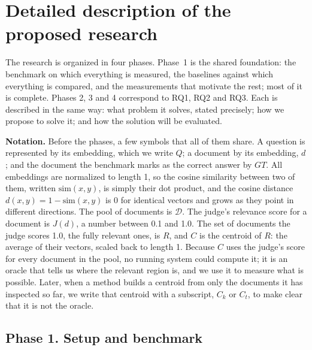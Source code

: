 \documentclass[12pt,a4paper]{article}
\newcommand{\dist}{d}
\newcommand{\simf}{\mathrm{sim}}
\begin{document}
\section{Detailed description of the proposed research}

The research is organized in four phases. Phase~1 is the shared foundation: the benchmark on which everything is measured, the baselines against which everything is compared, and the measurements that motivate the rest; most of it is complete. Phases 2, 3 and 4 correspond to RQ1, RQ2 and RQ3. Each is described in the same way: what problem it solves, stated precisely; how we propose to solve it; and how the solution will be evaluated.

\textbf{Notation.} Before the phases, a few symbols that all of them share. A question is represented by its embedding, which we write $Q$; a document by its embedding, $d$; and the document the benchmark marks as the correct answer by $GT$. All embeddings are normalized to length 1, so the cosine similarity between two of them, written $\simf(x,y)$, is simply their dot product, and the cosine distance $\dist(x,y)=1-\simf(x,y)$ is 0 for identical vectors and grows as they point in different directions. The pool of documents is $\mathcal{D}$. The judge's relevance score for a document is $J(d)$, a number between 0.1 and 1.0. The set of documents the judge scores 1.0, the fully relevant ones, is $R$, and $C$ is the centroid of $R$: the average of their vectors, scaled back to length 1. Because $C$ uses the judge's score for every document in the pool, no running system could compute it; it is an oracle that tells us where the relevant region is, and we use it to measure what is possible. Later, when a method builds a centroid from only the documents it has inspected so far, we write that centroid with a subscript, $C_k$ or $C_t$, to make clear that it is not the oracle.

\subsection{Phase 1. Setup and benchmark}
\label{sec:phase1}
\end{document}
